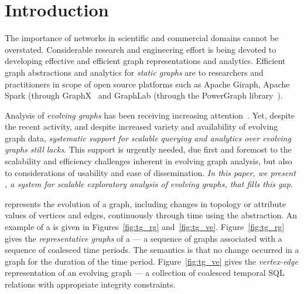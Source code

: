 \section{Introduction}
\label{sec:intro}

The importance of networks in scientific and commercial domains cannot
be overstated.  
Considerable research and engineering effort is being devoted to developing
effective and efficient graph representations and analytics.
Efficient graph abstractions and analytics for {\em static graphs} are
to researchers and practitioners in scope of open source platforms
such as Apache Giraph, Apache Spark (through
GraphX~\cite{DBLP:conf/osdi/GonzalezXDCFS14} and GraphLab (through
the PowerGraph library~\cite{DBLP:conf/osdi/GonzalezLGBG12}).

Analysis of {\em evolving graphs} has been receiving
increasing attention~\cite{DBLP:journals/csur/AggarwalS14,Chan2008,Kan2009,DBLP:journals/tos/MiaoHLWYZPCC15,Ren2011,Semertzidis2015}.
%
Yet, despite the recent activity, and
despite increased variety and availability of evolving graph data,
{\em systematic support for scalable querying and analytics over
  evolving graphs still lacks}.  This support is urgently needed, due
first and foremost to the scalability and efficiency challenges
inherent in evolving graph analysis, but also to considerations of
usability and ease of dissemination.  {\em In this paper, we present
  \ql, a system for scalable exploratory analysis of evolving graphs,
  that fills this gap.}

\ql represents the evolution of a graph, including changes in topology 
or attribute values of vertices and edges, continuously through time
using the \tg abstraction.  An example of a \tg is given in
Figures~\ref{fig:tg_rg} and~\ref{fig:tg_ve}.  Figure~\ref{fig:tg_rg} gives the
{\em representative graphs} of a \tg --- a sequence of
graphs associated with a sequence of coalesced time periods.  The semantics
is that no change occurred in a graph for the duration of
the time period. Figure~\ref{fig:tg_ve} gives the {\em vertex-edge}
representation of an evolving graph --- a collection of coalesced
temporal SQL relations with appropriate integrity constraints.

